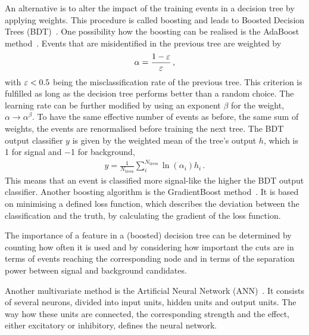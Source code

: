 An alternative is to alter the impact of the training events in a decision
tree by applying weights. This procedure is called boosting and leads to
Boosted Decision Trees (BDT)~\cite{Roe}. One possibility how the
boosting can be realised is the AdaBoost method~\cite{AdaBoost}. Events that
are misidentified in the previous tree are weighted by
\begin{align}
	\alpha = \frac{1 - {\varepsilon}}{{\varepsilon}}\,,
\end{align}
with ${\varepsilon} < \num{0.5}$ being the misclassification rate of the previous tree.
This criterion is fulfilled as long as the decision tree performs better than
a random choice. The learning rate can be further modified by using an
exponent $\beta$ for the weight, $\alpha \to \alpha^{\beta}$. To have the same
effective number of events as before, \ie the same sum of weights, the events
are renormalised before training the next tree. The BDT output classifier $y$
is given by the weighted mean of the tree's output $h$, which is \num{+1} for
signal and \num{-1} for background,
\begin{align}
	y = \frac{1}{N_{\textrm{trees}}} \sum_i^{N_{\textrm{trees}}} \ln(\alpha_i) h_i\,.
\end{align}
This means that an event is classified more signal-like the higher the BDT
output classifier. Another boosting algorithm is the GradientBoost
method~\cite{GradientBoost}. It is based on minimising a defined loss
function, which describes the deviation between the classification and the
truth, by calculating the gradient of the loss function.

The importance of a feature in a (boosted) decision tree can be determined by
counting how often it is used and by considering how important the cuts are in
terms of events reaching the corresponding node and in terms of the separation
power between signal and background candidates.

Another multivariate method is the Artificial Neural Network
(ANN)~\cite{Denby:1987rk}. It consists of several neurons, divided into input
units, hidden units and output units. The way how these units are connected,
the corresponding strength and the effect, either excitatory or inhibitory,
defines the neural network.

